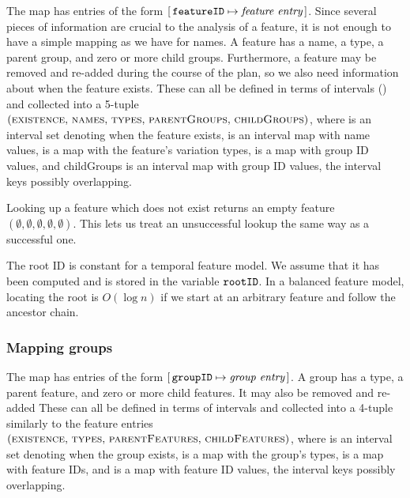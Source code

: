 
The \features{} map has entries of the form $[ \,\texttt{featureID} \mapsto \textit{feature entry}\, ]$. Since several pieces of information are crucial to the analysis of a feature, it is not enough to have a simple mapping as we have for names.
A feature has a name, a type, a parent group, and zero or more child groups. Furthermore, a feature may be removed and re-added during the course of the plan, so we also need information about when the feature exists.
These can all be defined in terms of intervals () and collected into a 5-tuple $(\textsc{existence} , \allowbreak \, \textsc{names} , \allowbreak \, \textsc{types} , \allowbreak \, \textsc{parentGroups} , \allowbreak \, \textsc{childGroups})$, where  is an interval set denoting when the feature exists,  is an interval map with name values,  is a map with the feature's variation types,  is a map with group ID values, and childGroups is an interval map with group ID values, the interval keys possibly overlapping. 

Looking up a feature which does not exist returns an empty feature $(\emptyset \comma \emptyset \comma \emptyset \comma \emptyset \comma \emptyset)$. This lets us treat an unsuccessful lookup the same way as a successful one.

The root ID is constant for a temporal feature model. We assume that it has been computed and is stored in the variable $\texttt{rootID}$. In a balanced feature model, locating the root is $O(\log n)$ if we start at an arbitrary feature and follow the ancestor chain. 

\subsubsection{Mapping groups}
\label{subsub:mapping-groups}

The \groups{} map has entries of the form $[ \,\texttt{groupID} \mapsto \textit{group entry}\, ]$. A group has a type, a parent feature, and zero or more child features. It may also be removed and re-added These can all be defined in terms of intervals and collected into a 4-tuple similarly to the feature entries $(\textsc{existence} , \allowbreak \, \textsc{types}  , \allowbreak \, \textsc{parentFeatures} , \allowbreak \, \textsc{childFeatures})$, where  is an interval set denoting when the group exists,  is a map with the group's types,  is a map with feature IDs, and  is a map with feature ID values, the interval keys possibly overlapping.

